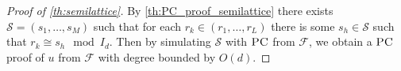 \documentclass[11pt]{article}
\newcommand{\PC}{\textsc{PC}}
\newcommand{\Max}{\textsf{Max}}
\newcommand{\Min}{\textsf{Min}}
\newcommand{\1}{\textbf{1}}
\newcommand{\GB}{\text{Gr\"{o}bner} }
\newtheorem{definition}[theorem]{Definition}
\newtheorem{proposition}[theorem]{Proposition}
\begin{document}
\begin{proof} [Proof of \cref{th:semilattice}]
    By \cref{th:PC_proof_semilattice} there exists $\mathcal{S} = (s_1, \dots, s_M)$ such that for each $r_k \in (r_1, \dots, r_L)$ there is some $s_h \in \mathcal{S}$ such that $r_k \cong s_h \mod{I_d}$. Then by simulating $\mathcal{S}$ with $\PC$ from $\mathcal{F}$, we obtain a $\PC$ proof of $u$ from $\mathcal{F}$ with degree bounded by $O(d)$.
    
\end{proof}










\end{document}
